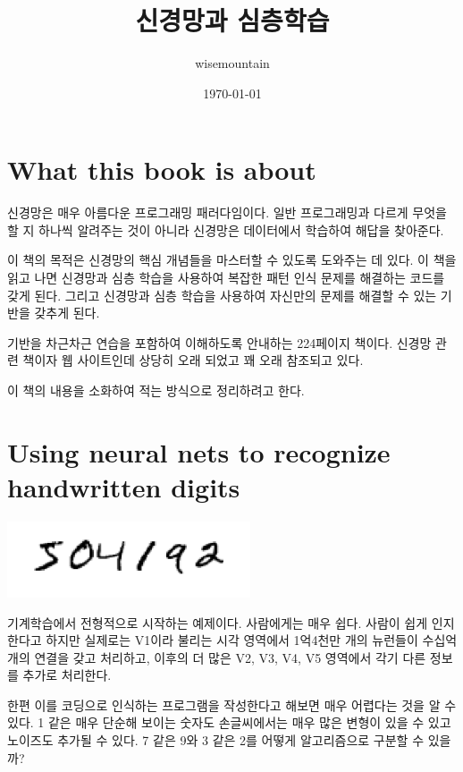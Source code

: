 \documentclass[ %
    a4paper,    %
    amsmath,    %
    itemph,     %
]{oblivoir}     %
\begin{document}
\title{신경망과 심층학습}
\author{wisemountain}
\date{\today}

\maketitle

\newpage

\tableofcontents

\newpage

\section{What this book is about}

신경망은 매우 아름다운 프로그래밍 패러다임이다. 일반 프로그래밍과 다르게 
무엇을 할 지 하나씩 알려주는 것이 아니라 신경망은 데이터에서 학습하여 
해답을 찾아준다. 

이 책의 목적은 신경망의 핵심 개념들을 마스터할 수 있도록 도와주는 데 있다. 
이 책을 읽고 나면 신경망과 심층 학습을 사용하여 복잡한 패턴 인식 문제를 해결하는 
코드를 갖게 된다. 그리고 신경망과 심층 학습을 사용하여 자신만의 문제를 
해결할 수 있는 기반을 갖추게 된다. 

기반을 차근차근 연습을 포함하여 이해하도록 안내하는 224페이지 책이다. 
신경망 관련 책이자 웹 사이트인데 상당히 오래 되었고 꽤 오래 참조되고 있다. 

이 책의 내용을 소화하여 적는 방식으로 정리하려고 한다. 

\section{Using neural nets to recognize handwritten digits}

\includegraphics[scale=0.5]{image/1_hand_written_digits}

기계학습에서 전형적으로 시작하는 예제이다. 
사람에게는 매우 쉽다. 사람이 쉽게 인지 한다고 하지만 실제로는 V1이라 불리는 시각 영역에서 
1억4천만 개의 뉴런들이 수십억 개의 연결을 갖고 처리하고, 
이후의 더 많은 V2, V3, V4, V5 영역에서 각기 다른 정보를 추가로 처리한다. 

한편 이를 코딩으로 인식하는 프로그램을 작성한다고 해보면 매우 어렵다는 것을 알 수 있다. 
1 같은 매우 단순해 보이는 숫자도 손글씨에서는 매우 많은 변형이 있을 수 있고
노이즈도 추가될 수 있다. 7 같은 9와 3 같은 2를 어떻게 알고리즘으로 구분할 수 있을까? 
\end{document}
